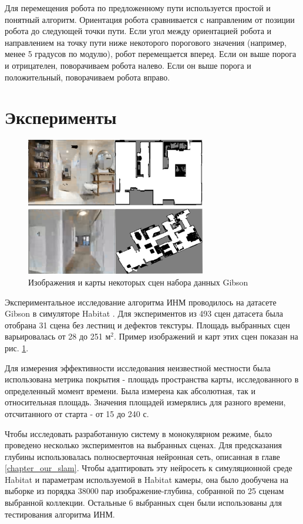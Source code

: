 \documentclass{mipt-thesis-ms}
\begin{document}
	Для перемещения робота по предложенному пути используется простой и понятный алгоритм. Ориентация робота сравнивается с направленим от позиции робота до следующей точки пути. Если угол между ориентацией робота и направлением на точку пути ниже некоторого порогового значения (например, менее 5 градусов по модулю), робот перемещается вперед. Если он выше порога и отрицателен, поворачиваем робота налево. Если он выше порога и положительный, поворачиваем робота вправо.
	
	\section{Эксперименты}
	
	\begin{figure}
		\centering
		\includegraphics[width=0.7\textwidth]{img/gibson_sample_with_map.png}
		\caption{Изображения и карты некоторых сцен набора данных Gibson}
		\label{figure_gibson_env}
	\end{figure}
	
	Экспериментальное исследование алгоритма ИНМ проводилось на датасете Gibson \cite{xia2018gibson} в симуляторе Habitat \cite{savva2019habitat}. Для экспериментов из 493 сцен датасета была отобрана 31 сцена без лестниц и дефектов текстуры. Площадь выбранных сцен варьировалась от 28 до 251 $\text{м}^2$. Пример изображений и карт этих сцен показан на рис. \ref{figure_gibson_env}.
	
	Для измерения эффективности исследования неизвестной местности была использована метрика покрытия - площадь пространства карты, исследованного в определенный момент времени. Была измерена как абсолютная, так и относительная площадь. Значения площадей измерялись для разного времени, отсчитанного от старта - от 15 до 240 с.
	
	Чтобы исследовать разработанную систему в монокулярном режиме, было проведено несколько экспериментов на выбранных сценах. Для предсказания глубины использовалась полносверточная нейронная сеть, описанная в главе \ref{chapter_our_slam}. Чтобы адаптировать эту нейросеть к симуляционной среде Habitat и параметрам используемой в Habitat камеры, она было дообучена на выборке из порядка 38000 пар изображение-глубина, собранной по 25 сценам выбранной коллекции. Остальные 6 выбранных сцен были использованы для тестирования алгоритма ИНМ.
	
\end{document}
